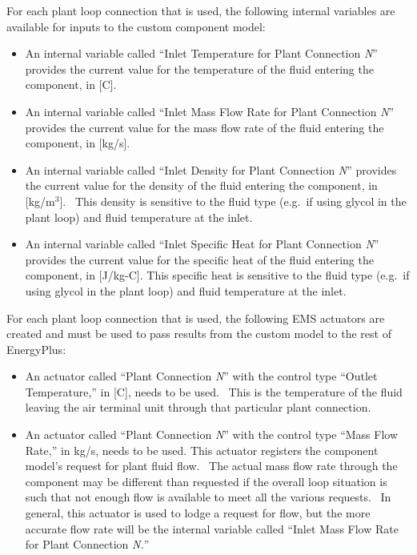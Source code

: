 For each plant loop connection that is used, the following internal variables are available for inputs to the custom component model:

\begin{itemize}
\item
  An internal variable called ``Inlet Temperature for Plant Connection \emph{N}'' provides the current value for the temperature of the fluid entering the component, in {[}C{]}.
\item
  An internal variable called ``Inlet Mass Flow Rate for Plant Connection \emph{N}'' provides the current value for the mass flow rate of the fluid entering the component, in {[}kg/s{]}.
\item
  An internal variable called ``Inlet Density for Plant Connection \emph{N}'' provides the current value for the density of the fluid entering the component, in {[}kg/m\(^{3}\){]}.~ This density is sensitive to the fluid type (e.g.~if using glycol in the plant loop) and fluid temperature at the inlet.
\item
  An internal variable called ``Inlet Specific Heat for Plant Connection \emph{N}'' provides the current value for the specific heat of the fluid entering the component, in {[}J/kg-C{]}. This specific heat is sensitive to the fluid type (e.g.~if using glycol in the plant loop) and fluid temperature at the inlet.
\end{itemize}

For each plant loop connection that is used, the following EMS actuators are created and must be used to pass results from the custom model to the rest of EnergyPlus:

\begin{itemize}
\item
  An actuator called ``Plant Connection \emph{N}'' with the control type ``Outlet Temperature,'' in {[}C{]}, needs to be used.~ This is the temperature of the fluid leaving the air terminal unit through that particular plant connection.
\item
  An actuator called ``Plant Connection \emph{N}'' with the control type ``Mass Flow Rate,'' in kg/s, needs to be used. This actuator registers the component model's request for plant fluid flow.~ The actual mass flow rate through the component may be different than requested if the overall loop situation is such that not enough flow is available to meet all the various requests.~ In general, this actuator is used to lodge a request for flow, but the more accurate flow rate will be the internal variable called ``Inlet Mass Flow Rate for Plant Connection \emph{N.}''
\end{itemize}

